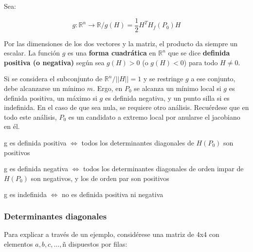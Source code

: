 \documentclass{article}
\renewcommand{\Bbb}{\mathbb}
\begin{document}
Sea:

\begin{equation}
g:\Bbb R^n \rightarrow \Bbb R / g(H) = \frac{1}{2} H^T H_f(P_0) H
\end{equation}

Por las dimensiones de los dos vectores y la matriz, el producto da siempre un escalar. La función $g$ es una \textbf{forma cuadrática} en $\Bbb R^n$ que se dice \textbf{definida positiva (o negativa)} según sea $g(H) > 0$ (o $g(H) < 0$) para todo $H \neq 0$.  

Si se considera el subconjunto de $\Bbb R^n / ||H|| = 1$ y se restringe $g$ a ese conjunto, debe alcanzarse un mínimo $m$. Ergo, en $P_0$ se alcanza un mínimo local si $g$ es definida positiva, un máximo si $g$ es definida negativa, y un punto silla si es indefinida. En el caso de que sea nula, se requiere otro análisis. Recuérdese que en todo este análisis, $P_0$ es un candidato a extremo local por anularse el jacobiano en él.

g es definida positiva $\Leftrightarrow$ todos los determinantes diagonales de $H(P_0)$ son positivos

g es definida negativa $\Leftrightarrow$ todos los determinantes diagonales de orden impar de $H(P_0)$ son negativos, y los de orden par son positivos

g es indefinida $\Leftrightarrow$ no es definida positiva ni negativa

\subsubsection{Determinantes diagonales}

Para explicar a través de un ejemplo, considérese una matriz de 4x4 con elementos $a, b, c, \ldots , $ñ dispuestos por filas:
\end{document}
